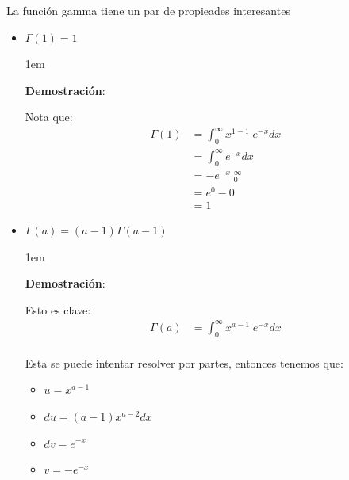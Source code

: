 \documentclass[12pt, fleqn]{report}                             %
\newenvironment{SmallIndentation}[1][0.75em]                    %
        {\begin{adjustwidth}{#1}{}\begin{footnotesize}}             %
        {\end{footnotesize}\end{adjustwidth}}                       %
\theoremstyle{break}                                            %
\DeclareMathOperator \Evaluate  {\Big|}                         %
\begin{document}
                    La función gamma tiene un par de propieades interesantes
                    \begin{itemize}
                        \item 
                            $\Gamma(1) = 1$
                            \begin{SmallIndentation}[1em]
                                \textbf{Demostración}:
                                
                                Nota que:
                                \begin{align*}
                                    \Gamma(1)
                                        &= \int_0^\infty x^{1 - 1} \; e^{-x} dx     \\
                                        &= \int_0^\infty  e^{-x} dx                 \\
                                        &= - e^{-x} \Evaluate_0^\infty              \\
                                        &= e^0 - 0                                  \\
                                        &= 1
                                \end{align*}
                            
                            \end{SmallIndentation}
                            
                        \item $\Gamma(a) = (a - 1)\Gamma(a - 1)$

                            \begin{SmallIndentation}[1em]
                                \textbf{Demostración}:
                                
                                Esto es clave:
                                \begin{align*}
                                    \Gamma(a)
                                        &= \int_0^\infty x^{a - 1} \; e^{-x} dx     \\                                   
                                \end{align*}

                                Esta se puede intentar resolver por partes, entonces
                                tenemos que:
                                \begin{itemize}
                                    \item $u  = x^{a - 1}$
                                    \item $du  = (a -1)x^{a - 2} dx$
                                    \item $dv  = e^{-x}$
                                    \item $v   = -e^{-x}$
                                \end{itemize}


\end{SmallIndentation}
\end{itemize}
\end{document}
